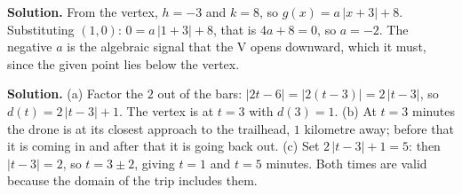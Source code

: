 \documentclass[12pt]{article}
\begin{document}


\textbf{Solution.} From the vertex, $h = -3$ and $k = 8$, so $g(x) = a\,|x + 3| + 8$. Substituting $(1, 0)$: $0 = a\,|1 + 3| + 8$, that is $4a + 8 = 0$, so $a = -2$. The negative $a$ is the algebraic signal that the V opens downward, which it must, since the given point lies below the vertex.



\textbf{Solution.} (a) Factor the $2$ out of the bars: $|2t - 6| = |2(t - 3)| = 2\,|t - 3|$, so $d(t) = 2\,|t - 3| + 1$. The vertex is at $t = 3$ with $d(3) = 1$. (b) At $t = 3$ minutes the drone is at its closest approach to the trailhead, $1$ kilometre away; before that it is coming in and after that it is going back out. (c) Set $2\,|t - 3| + 1 = 5$: then $|t - 3| = 2$, so $t = 3 \pm 2$, giving $t = 1$ and $t = 5$ minutes. Both times are valid because the domain of the trip includes them.

\end{document}
